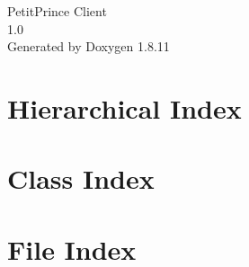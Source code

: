 \documentclass[twoside]{book}
\newcommand{\+}{\discretionary{\mbox{\scriptsize$\hookleftarrow$}}{}{}}
\newcommand{\clearemptydoublepage}{%
  \newpage{\pagestyle{empty}\cleardoublepage}%
}
\begin{document}
\hypersetup{pageanchor=false,
             bookmarksnumbered=true,
             pdfencoding=unicode
            }
\begin{titlepage}
\vspace*{7cm}
\begin{center}%
{\Large Petit\+Prince Client \\[1ex]\large 1.\+0 }\\
\vspace*{1cm}
{\large Generated by Doxygen 1.8.11}\\
\end{center}
\end{titlepage}
\clearemptydoublepage
\tableofcontents
\clearemptydoublepage
{}
\hypersetup{pageanchor=true}

\chapter{Hierarchical Index}

\chapter{Class Index}

\chapter{File Index}

\end{document}
